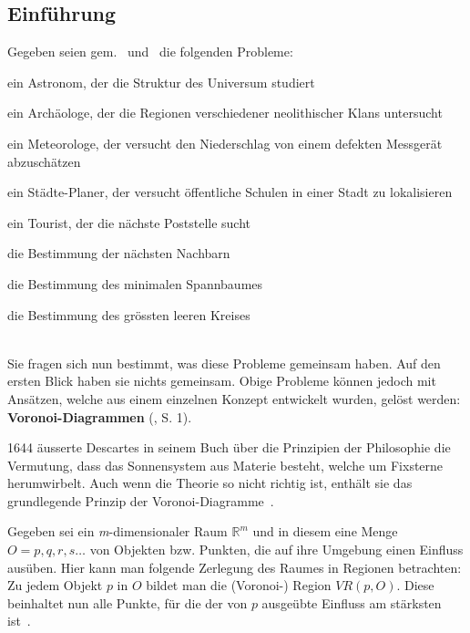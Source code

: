 \subsection{Einführung}
\label{subsec:voronoi-introduction}

Gegeben seien gem.~\cite{klein2005algorithmischegeometrie} und~\cite{atsuyuki2000spatialtessellations} die folgenden Probleme:

\begin{compactitem}
\item ein Astronom, der die Struktur des Universum studiert
\item ein Archäologe, der die Regionen verschiedener neolithischer Klans untersucht
\item ein Meteorologe, der versucht den Niederschlag von einem defekten Messgerät abzuschätzen
\item ein Städte-Planer, der versucht öffentliche Schulen in einer Stadt zu lokalisieren
\item ein Tourist, der die nächste Poststelle sucht
\item die Bestimmung der nächsten Nachbarn
\item die Bestimmung des minimalen Spannbaumes
\item die Bestimmung des grössten leeren Kreises
\end{compactitem}

\noindent\hspace*{0mm} \\Sie fragen sich nun bestimmt, was diese Probleme gemeinsam haben. Auf den ersten Blick haben sie nichts gemeinsam. Obige Probleme können jedoch mit Ansätzen, welche aus einem einzelnen Konzept entwickelt wurden, gelöst werden: \textbf{Voronoi-Diagrammen} (\citeyear{atsuyuki2000spatialtessellations}, S. 1).

1644 äusserte Descartes in seinem Buch über die Prinzipien der Philosophie die Vermutung, dass das Sonnensystem aus Materie besteht, welche um Fixsterne herumwirbelt.
Auch wenn die Theorie so nicht richtig ist, enthält sie das grundlegende Prinzip der Voronoi-Diagramme~\parencite[S. 209]{klein2005algorithmischegeometrie}.

Gegeben sei ein \textit{m}-dimensionaler Raum $\mathbb{R}^m$ und in diesem eine Menge $O = {p, q, r, s \dots}$ von Objekten bzw. Punkten, die auf ihre Umgebung einen Einfluss ausüben. Hier kann man folgende Zerlegung des Raumes in Regionen betrachten: Zu jedem Objekt $p$ in $O$ bildet man die (Voronoi-) Region $VR(p, O)$. Diese beinhaltet nun alle Punkte, für die der von $p$ ausgeübte Einfluss am stärksten ist~\parencite[S. 209]{klein2005algorithmischegeometrie}.
\newpage{}

